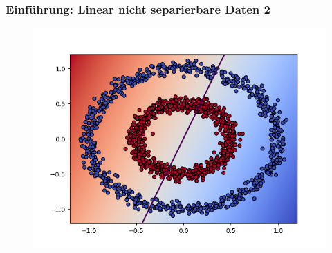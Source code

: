 	\begin{frame}
		\frametitle{Einführung: Linear nicht separierbare Daten 2}
			\begin{figure}
					\includegraphics[width=\textwidth]{img/nonlinearsvmwbl.png}
			\end{figure}
	\end{frame}
	
